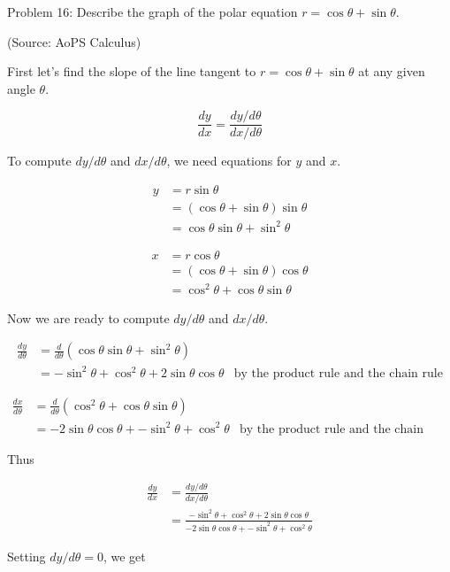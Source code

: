 Problem 16: Describe the graph of the polar equation $r = \cos \theta + \sin \theta$.

(Source: AoPS Calculus)

First let's find the slope of the line tangent to $r = \cos \theta + \sin \theta$ at any given angle $\theta$.

$$ \frac{dy}{dx} = \frac{dy/d\theta}{dx/d\theta} $$

To compute $dy/d\theta$ and $dx/d\theta$, we need equations for $y$ and $x$.

\begin{align*}
y &= r \sin \theta \\
&= \left(\cos \theta + \sin \theta\right) \sin \theta \\
&= \cos \theta \sin \theta + \sin^2 \theta
\end{align*}

\begin{align*}
x &= r \cos \theta \\
&= \left(\cos \theta + \sin \theta\right) \cos \theta \\
&= \cos^2 \theta + \cos \theta \sin \theta
\end{align*}

Now we are ready to compute $dy/d\theta$ and $dx/d\theta$.

\begin{align*}
\frac{dy}{d\theta} &= \frac{d}{d\theta} \left(\cos \theta \sin \theta + \sin^2 \theta\right) \\
&= -\sin^2 \theta + \cos^2 \theta + 2 \sin \theta \cos \theta & \text{by the product rule and the chain rule}
\end{align*}

\begin{align*}
\frac{dx}{d\theta} &= \frac{d}{d\theta} \left(\cos^2 \theta + \cos \theta \sin \theta\right) \\
&= -2 \sin \theta \cos \theta + -\sin^2 \theta + \cos^2 \theta & \text{by the product rule and the chain rule}
\end{align*}

Thus

\begin{align*}
\frac{dy}{dx} &= \frac{dy/d\theta}{dx/d\theta} \\
&= \frac{-\sin^2 \theta + \cos^2 \theta + 2 \sin \theta \cos \theta}{-2 \sin \theta \cos \theta + -\sin^2 \theta + \cos^2 \theta}
\end{align*}

Setting $dy/d\theta = 0$, we get

